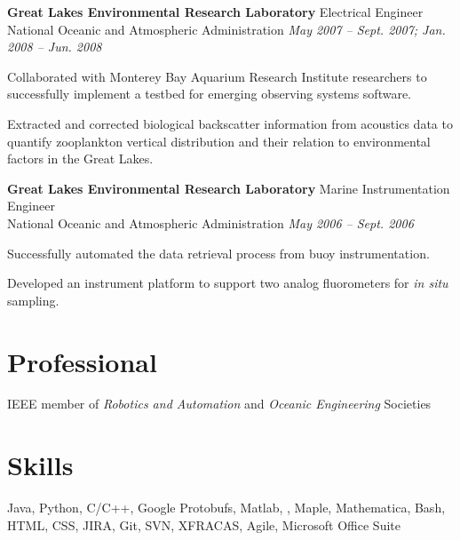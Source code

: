 \documentclass[margin, line]{resume}
\begin{document}
\begin{resume}
   \pagebreak

    \textbf{Great Lakes Environmental Research Laboratory } \hfill  Electrical Engineer \\ 
	National Oceanic and Atmospheric Administration \hfill \textsl{May 2007 -- Sept. 2007; Jan. 2008 -- Jun. 2008}  \\
    \vspace{ -2 mm}	
    \begin{list2}
	\item Collaborated with Monterey Bay Aquarium Research Institute researchers to successfully implement a testbed for emerging 	observing systems software.
	\item Extracted and corrected biological backscatter information from acoustics data to quantify zooplankton vertical distribution and 	their relation to environmental factors in the Great Lakes.
    \end{list2}\vspace{-2mm}

    \textbf{Great Lakes Environmental Research Laboratory } \hfill Marine Instrumentation Engineer  \\ 
	National Oceanic and Atmospheric Administration \hfill \textsl{May 2006 -- Sept. 2006} \\
    \vspace{ -2 mm}	
    \begin{list2}
	\item Successfully automated the data retrieval process from buoy instrumentation.
	\item Developed an instrument platform to support two analog fluorometers for \textit{in situ} sampling.
    \end{list2}\vspace{-2mm}

    \section{\mysidestyle Professional} 

    IEEE member of \textsl{Robotics and Automation} and \textsl{Oceanic Engineering} Societies  
	    
	\vspace{-4mm}
    \section{\mysidestyle Skills} 

    Java, Python, C/C++, Google Protobufs, Matlab, \LaTeXe, Maple, Mathematica, Bash, HTML, CSS, JIRA, Git, SVN, XFRACAS, Agile, Microsoft Office Suite

\end{resume}
\end{document}
